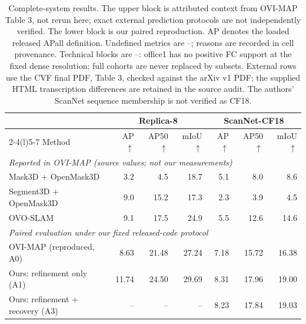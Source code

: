 \begin{table}[!ht]
\centering
\caption{Complete-system results. The upper block is attributed context from OVI-MAP Table 3, not rerun here; exact external prediction protocols are not independently verified. The lower block is our paired reproduction. AP denotes the loaded released APall definition. Undefined metrics are --; reasons are recorded in cell provenance. Technical blocks are --: office1 has no positive FC support at the fixed dense resolution; full cohorts are never replaced by subsets. External rows use the CVF final PDF, Table 3, checked against the arXiv v1 PDF; the supplied HTML transcription differences are retained in the source audit. The authors' ScanNet sequence membership is not verified as CF18.}
\label{tab:main}
\fontsize{9}{10.5}\selectfont
\setlength{\tabcolsep}{5pt}
\begin{tabular*}{\textwidth}{@{\extracolsep{\fill}}lrrrrrr@{}}
\toprule
& \multicolumn{3}{c}{Replica-8} & \multicolumn{3}{c}{ScanNet-CF18} \\
\cmidrule(lr){2-4}\cmidrule(l){5-7}
Method & AP$\uparrow$ & AP50$\uparrow$ & mIoU$\uparrow$ & AP$\uparrow$ & AP50$\uparrow$ & mIoU$\uparrow$ \\
\midrule
\multicolumn{7}{l}{\emph{Reported in OVI-MAP (source values; not our measurements)}}\\
Mask3D + OpenMask3D & 3.2 & 4.5 & 18.7 & 5.1 & 8.0 & 8.6 \\
Segment3D + OpenMask3D & 9.0 & 15.2 & 17.3 & 2.3 & 3.9 & 4.5 \\
OVO-SLAM & 9.1 & 17.5 & 24.9 & 5.5 & 12.6 & 14.6 \\
\midrule
\multicolumn{7}{l}{\emph{Paired evaluation under our fixed released-code protocol}}\\
OVI-MAP (reproduced, A0) & 8.63 & 21.48 & 27.24 & 7.18 & 15.72 & 16.38 \\
Ours: refinement only (A1) & 11.74 & 24.50 & 29.69 & 8.31 & 17.96 & 19.00 \\
Ours: refinement + recovery (A3) & -- & -- & -- & 8.23 & 17.84 & 19.03 \\
\bottomrule
\end{tabular*}
\end{table}
